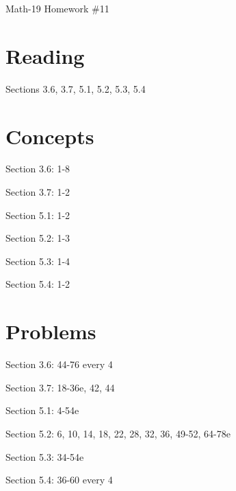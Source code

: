 \documentclass[letterpaper,12pt,fleqn]{article}
\begin{document}
\begin{center}
\Large Math-19 Homework \#11
\end{center}

\section*{Reading}

Sections 3.6, 3.7, 5.1, 5.2, 5.3, 5.4

\section*{Concepts}

Section 3.6: 1-8

Section 3.7: 1-2

Section 5.1: 1-2

Section 5.2: 1-3

Section 5.3: 1-4

Section 5.4: 1-2

\section*{Problems}

Section 3.6: 44-76 every 4

Section 3.7: 18-36e, 42, 44

Section 5.1: 4-54e

Section 5.2: 6, 10, 14, 18, 22, 28, 32, 36, 49-52, 64-78e

Section 5.3: 34-54e

Section 5.4: 36-60 every 4
\end{document}
